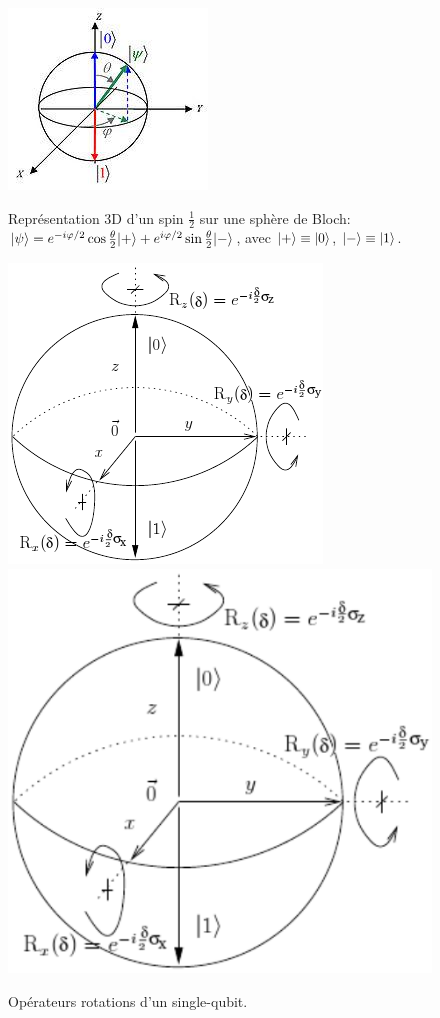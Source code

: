 \begin{figure}[ptbh]
\begin{minipage}[c]{.45\linewidth}
\centering
  \includegraphics[scale=1]{graphics/SphereBloch.jpg}
\caption{Représentation 3D d'un spin $\frac{1}{2}$ sur une sphère de Bloch:
$\vert\psi\rangle =e^{-i\varphi/2}\cos\frac{\theta}{2}\vert+\rangle
+e^{i\varphi/2}\sin\frac{\theta}{2}\vert-\rangle$, avec $\vert+\rangle\equiv\vert0\rangle$,
$\vert-\rangle\equiv\vert1\rangle$.}
\label{fig:ReprSpin12Bloch}
\end{minipage} \hfill
\begin{minipage}[c]{.48\linewidth}
\centering
\ifcase\msipdfoutput
  \includegraphics[scale=.7]{graphics/SphereBloch2.png}
\else
  \includegraphics[scale=.7]{graphics/SphereBloch2.pdf}
\fi
\caption{Opérateurs rotations d'un single-qubit.}%
\label{fig:SphereBloch2}%
\end{minipage}

\end{figure}


